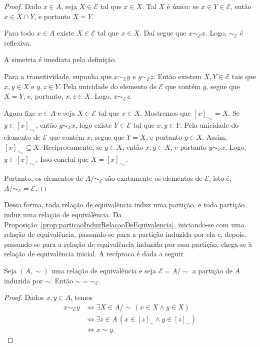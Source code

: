 \begin{proof}
    Dado $x \in A$, seja $X \in \mathcal{E}$ tal que $x \in X$.
    Tal $X$ é único: se $x \in Y \in \mathcal{E}$, então $x \in X \cap Y$, e portanto $X=Y$.

    Para todo $x \in A$ existe $X \in \mathcal{E}$ tal que $x \in X$.
    Daí segue que $x \sim_{\mathcal{E}} x$.
    Logo, $\sim_{\mathcal{E}}$ é reflexiva.

    A simetria é imediata pela definição.

    Para a transitividade, suponha que $x \sim_{\mathcal{E}} y$ e $y \sim_{\mathcal{E}} z$.
    Então existem $X, Y \in \mathcal{E}$ tais que $x, y \in X$ e $y, z \in Y$.
    Pela unicidade do elemento de $\mathcal{E}$ que contém $y$, segue que $X=Y$, e, portanto, $x, z \in X$.
    Logo, $x \sim_{\mathcal{E}} z$.

    Agora fixe $x \in A$ e seja $X \in \mathcal{E}$ tal que $x \in X$.
    Mostremos que $[x]_{\sim_{\mathcal{E}}}=X$.
    Se $y \in [x]_{\sim_{\mathcal{E}}}$, então $y \sim_{\mathcal{E}} x$, logo existe $Y \in \mathcal{E}$ tal que $x, y \in Y$.
    Pela unicidade do elemento de $\mathcal{E}$ que contém $x$, segue que $Y=X$, e portanto $y \in X$.
    Assim, $[x]_{\sim_{\mathcal{E}}} \subseteq X$.
    Reciprocamente, se $y \in X$, então $x, y \in X$, e portanto $y \sim_{\mathcal{E}} x$.
    Logo, $y \in [x]_{\sim_{\mathcal{E}}}$.
    Isso conclui que $X=[x]_{\sim_{\mathcal{E}}}$.

    Portanto, os elementos de $A/{\sim_{\mathcal{E}}}$ são exatamente os elementos de $\mathcal{E}$, isto é, $A/{\sim_{\mathcal{E}}}=\mathcal{E}$.
\end{proof}

Dessa forma, toda relação de equivalência induz uma partição, e toda partição induz uma relação de equivalência.
Da Proposição~\ref{prop:particaoInduzRelacaoDeEquivalencia}, iniciando-se com uma relação de equivalência, passando-se para a partição induzida por ela e, depois, passando-se para a relação de equivalência induzida por essa partição, chega-se à relação de equivalência inicial.
A recíproca é dada a seguir.

\begin{proposition}[$\ZFmI$]\label{prop:relacaoDeEquivalenciaInduzidaPelaParticao}
    Seja $(A, \sim)$ uma relação de equivalência e seja $\mathcal{E}=A/{\sim}$ a partição de $A$ induzida por $\sim$.
    Então $\sim = \sim_{\mathcal{E}}$.
\end{proposition}
\begin{proof}
    Dados $x, y \in A$, temos
    \[
    \begin{aligned}
        x \sim_{\mathcal{E}} y
        &\iff \exists X \in A/{\sim}\, (x \in X \wedge y \in X) \\
        &\iff \exists z \in A\, (x \in [z]_{\sim} \wedge y \in [z]_{\sim}) \\
        &\iff x \sim y.
    \end{aligned}
    \]
\end{proof}

